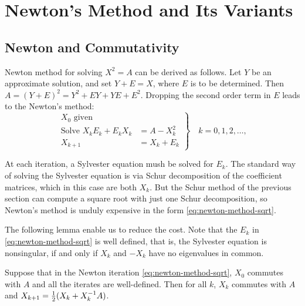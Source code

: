 \documentclass{article}
\begin{document}
\section{Newton's Method and Its Variants}

\subsection{Newton and Commutativity}

Newton method for solving $X^2 = A$ can be derived as follows. Let $Y$ be
an approximate solution, and set $Y + E = X$, where $E$ is to be
determined. Then $A = (Y + E)^2 = Y^2 + EY + YE + E^2$. Dropping the second
order term in $E$ leads to the Newton's method:
\begin{equation}
  \label{eq:newton-method-sqrt}
  \left.
  \begin{aligned}
     X_0 \text{ given} & \\
     \text{Solve } X_kE_k + E_kX_k & = A - X_k^2 \\
     X_{k+1} & = X_{k} + E_k     
  \end{aligned} \right\} \quad k = 0,1,2,\dots,
\end{equation}

At each iteration, a Sylvester equation mush be solved for $E_k$. The
standard way of solving the Sylvester equation is via Schur decomposition
of the coefficient matrices, which in this case are both $X_k$. But the
Schur method of the previous section can compute a square root with just
one Schur decomposition, so Newton's method is unduly expensive in the form
\eqref{eq:newton-method-sqrt}. 

The following lemma enable us to reduce the cost. Note that the $E_k$ in
\eqref{eq:newton-method-sqrt} is well defined, that is, the Sylvester
equation is nonsingular, if and only if $X_k$ and $-X_{k}$ have no
eigenvalues in common. 

\begin{lemma}
  Suppose that in the Newton iteration \eqref{eq:newton-method-sqrt}, $X_0$
  commutes with $A$ and all the iterates are well-defined. Then for all
  $k$, $X_k$ commutes with $A$ and $X_{k+1} = \frac{1}{2}(X_k + X_k^{-1} A)$.
\end{lemma}
\end{document}

